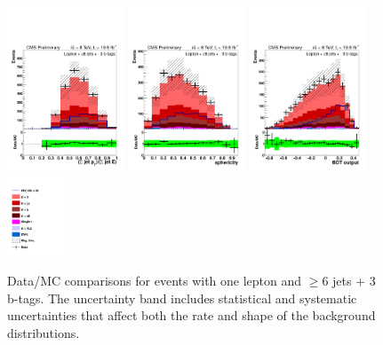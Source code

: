 \begin{figure}[hbtp]
\begin{center}
   \includegraphics[width=0.31\textwidth]{Figures/Analysis_2_Diagrams/LJ_plots_lep/6j3t/lep_pt_all_jets_over_E_all_jets_6j3t_cumulative_wRatio_noLegend_lin.pdf}
   \includegraphics[width=0.31\textwidth]{Figures/Analysis_2_Diagrams/LJ_plots_lep/6j3t/lep_sphericity_6j3t_cumulative_wRatio_noLegend_lin.pdf}
   \includegraphics[width=0.31\textwidth]{Figures/Analysis_2_Diagrams/LJ_plots_lep/6j3t/lep_disc_ttH_ttbb_6j3t_8TeV_CFMlpANN_BDT_6j3t_cumulative_wRatio_noLegend_lin.pdf}
   \includegraphics[width=0.15\textwidth]{Figures/Analysis_2_Diagrams/LJ_plots_lep/ttH_legend_1columns.pdf}
   \caption{Data/MC comparisons for events with one lepton and $\ge$6 jets + 3 b-tags.  The uncertainty band includes statistical and systematic uncertainties that affect both the rate and shape of the background distributions.}
   \label{fig:lj_input_II_6j3t_1}
 \end{center}
\end{figure}

